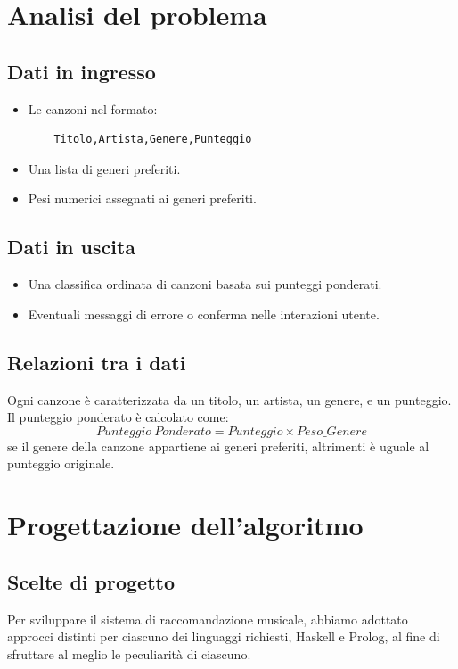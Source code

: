 \documentclass[a4paper,11pt]{article}
\begin{document}
\newpage
\section{Analisi del problema}
\subsection{Dati in ingresso}
\begin{itemize}
    \item Le canzoni nel formato:
    \begin{verbatim}
    Titolo,Artista,Genere,Punteggio
    \end{verbatim}
    \item Una lista di generi preferiti.
    \item Pesi numerici assegnati ai generi preferiti.
\end{itemize}

\subsection{Dati in uscita}
\begin{itemize}
    \item Una classifica ordinata di canzoni basata sui punteggi ponderati.
    \item Eventuali messaggi di errore o conferma nelle interazioni utente.
\end{itemize}

\subsection{Relazioni tra i dati}
Ogni canzone è caratterizzata da un titolo, un artista, un genere, e un punteggio. Il punteggio ponderato è calcolato come:
\[
Punteggio\ Ponderato = Punteggio \times Peso\_{Genere}
\]
se il genere della canzone appartiene ai generi preferiti, altrimenti è uguale al punteggio originale.

\newpage
\section{Progettazione dell'algoritmo}
\subsection{Scelte di progetto}
Per sviluppare il sistema di raccomandazione musicale, abbiamo adottato approcci distinti per ciascuno dei linguaggi richiesti, Haskell e Prolog, al fine di sfruttare al meglio le peculiarità di ciascuno.
\end{document}
